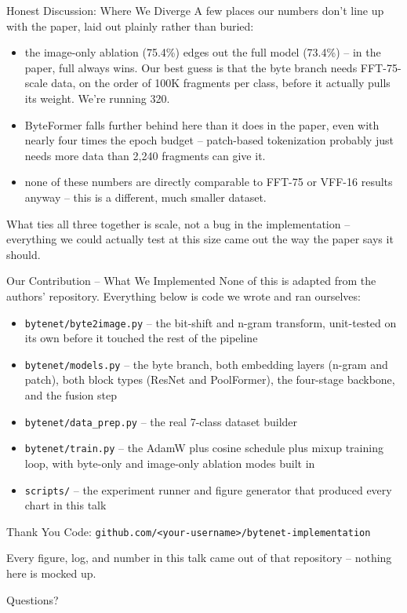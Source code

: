 \documentclass{beamer}
\begin{document}
\begin{frame}{Honest Discussion: Where We Diverge}
A few places our numbers don't line up with the paper, laid out plainly
rather than buried:
\begin{itemize}
    \item the image-only ablation (75.4\%) edges out the full model
    (73.4\%) -- in the paper, full always wins. Our best guess is that
    the byte branch needs FFT-75-scale data, on the order of 100K
    fragments per class, before it actually pulls its weight. We're
    running 320.
    \item ByteFormer falls further behind here than it does in the
    paper, even with nearly four times the epoch budget -- patch-based
    tokenization probably just needs more data than 2{,}240 fragments
    can give it.
    \item none of these numbers are directly comparable to FFT-75 or
    VFF-16 results anyway -- this is a different, much smaller dataset.
\end{itemize}
\vspace{0.4em}
What ties all three together is scale, not a bug in the implementation
-- everything we could actually test at this size came out the way the
paper says it should.
\end{frame}

\begin{frame}{Our Contribution -- What We Implemented}
None of this is adapted from the authors' repository. Everything below
is code we wrote and ran ourselves:
\begin{itemize}
    \item \texttt{bytenet/byte2image.py} -- the bit-shift and n-gram
    transform, unit-tested on its own before it touched the rest of the
    pipeline
    \item \texttt{bytenet/models.py} -- the byte branch, both embedding
    layers (n-gram and patch), both block types (ResNet and PoolFormer),
    the four-stage backbone, and the fusion step
    \item \texttt{bytenet/data\_prep.py} -- the real 7-class dataset
    builder
    \item \texttt{bytenet/train.py} -- the AdamW plus cosine schedule
    plus mixup training loop, with byte-only and image-only ablation
    modes built in
    \item \texttt{scripts/} -- the experiment runner and figure
    generator that produced every chart in this talk
\end{itemize}
\end{frame}

\begin{frame}{Thank You}
\centering
Code: \texttt{github.com/\textless your-username\textgreater/bytenet-implementation}

\vspace{1em}
Every figure, log, and number in this talk came out of that repository --
nothing here is mocked up.

\vspace{1.5em}
Questions?
\end{frame}
\end{document}
